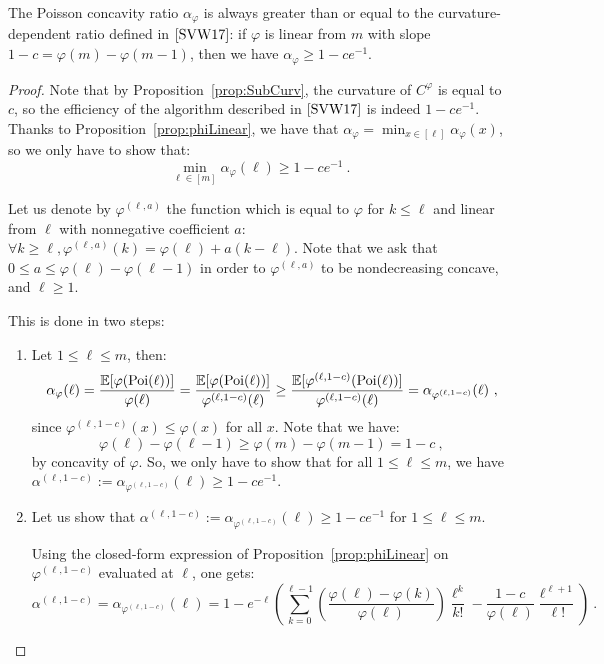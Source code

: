 \begin{proposition}
  The Poisson concavity ratio $\alpha_{\varphi}$ is always greater than or equal to the curvature-dependent ratio defined in $\cite{SVW17}$: if $\varphi$ is linear from $m$ with slope $1-c = \varphi(m) - \varphi(m-1)$, then we have $\alpha_{\varphi} \geq 1 - ce^{-1}$.
  \label{prop:BetterRatio}
\end{proposition}

\begin{proof}
  Note that by Proposition~\ref{prop:SubCurv}, the curvature of $C^{\varphi}$ is equal to $c$, so the efficiency of the algorithm described in $\cite{SVW17}$ is indeed $ 1 - ce^{-1}$.
  Thanks to Proposition~\ref{prop:phiLinear}, we have that $\alpha_{\varphi} = \min_{x \in [\ell]} \alpha_{\varphi}(x)$, so we only have to show that:
  \[\min_{\ell \in [m]} \alpha_{\varphi}(\ell) \geq 1 - ce^{-1} \ .\]

  Let us denote by $\varphi^{(\ell,a)}$ the function which is equal to $\varphi$ for $k \leq \ell$ and linear from $\ell$ with nonnegative coefficient $a$: $\forall k \geq \ell, \varphi^{(\ell,a)}(k) = \varphi(\ell) + a(k-\ell)$. Note that we ask that $0 \leq a \leq \varphi(\ell)-\varphi(\ell-1)$ in order to $\varphi^{(\ell,a)}$ to be nondecreasing concave, and $\ell \geq 1$.

This is done in two steps:

\begin{enumerate}
\item Let $1 \leq \ell \leq m$, then:
  \[\alpha_{\varphi}(\ell) = \frac{\mathbb{E}[\varphi(\operatorname{\text{Poi}}(\ell))]}{\varphi(\ell)} = \frac{\mathbb{E}[\varphi(\operatorname{\text{Poi}}(\ell))]}{\varphi^{(\ell,1-c)}(\ell)} \geq \frac{\mathbb{E}[\varphi^{(\ell,1-c)}(\operatorname{\text{Poi}}(\ell))]}{\varphi^{(\ell,1-c)}(\ell)} = \alpha_{\varphi^{(\ell,1-c)}}(\ell) \ , \]
  since $\varphi^{(\ell,1-c)}(x) \leq \varphi(x)$ for all $x$. Note that we have:
  \[ \varphi(\ell)-\varphi(\ell-1) \geq \varphi(m)-\varphi(m-1) = 1-c \ ,\]
  by concavity of $\varphi$. So, we only have to show that for all $1 \leq \ell \leq m$, we have $\alpha^{(\ell,1-c)} := \alpha_{\varphi^{(\ell,1-c)}}(\ell) \geq 1 - ce^{-1}$.

  
\item Let us show that $\alpha^{(\ell,1-c)} := \alpha_{\varphi^{(\ell,1-c)}}(\ell) \geq 1 - ce^{-1}$ for $1 \leq \ell \leq m$.

  Using the closed-form expression of Proposition~\ref{prop:phiLinear} on $\varphi^{(\ell,1-c)}$ evaluated at $\ell$, one gets:
  \[ \alpha^{(\ell,1-c)} = \alpha_{\varphi^{(\ell,1-c)}}(\ell) = 1 - e^{-\ell}\left(\sum_{k=0}^{\ell-1}\left(\frac{\varphi(\ell)-\varphi(k)}{\varphi(\ell)}\right)\frac{\ell^k}{k!}  - \frac{1-c}{\varphi(\ell)}\frac{\ell^{\ell+1}}{\ell!} \right) \ .\]
  

\end{enumerate}
\end{proof}
